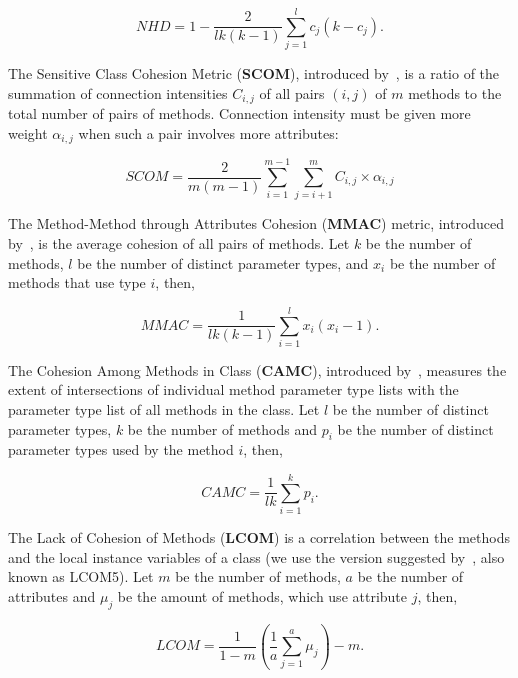 \documentclass[sigconf,10pt,nonacm=true]{acmart}
\begin{document}
\begin{equation}
\mathit{NHD} = 1 - \frac{2}{lk(k-1)} \sum_{j=1}^{l} c_j(k-c_j).
\end{equation}

The Sensitive Class Cohesion Metric (\textbf{SCOM}),
introduced by~\citet{fernandez06}, is a
ratio of the summation of connection intensities $C_{i,j}$ of
all pairs $(i,j)$ of $m$ methods to the total number of pairs of methods.
Connection intensity must be given more weight $\alpha_{i,j}$ when such a
pair involves more attributes:

\begin{equation}
\mathit{SCOM} = \frac{2}{m(m-1)} \sum_{i=1}^{m-1} \sum_{j=i+1}^{m} C_{i,j} \times \alpha_{i,j}
\end{equation}

The Method-Method through Attributes Cohesion (\textbf{MMAC}) metric,
introduced by~\citet{dallal07}, is
the average cohesion of all pairs of methods.
Let $k$ be the number of methods, $l$ be the number of distinct parameter types,
and $x_i$ be the number of methods that use type $i$, then,

\begin{equation}
\mathit{MMAC} = \frac{1}{lk(k-1)} \displaystyle\sum_{i=1}^{l} x_i (x_i - 1).
\end{equation}

The Cohesion Among Methods in Class (\textbf{CAMC}), introduced by~\citet{bansiya99},
measures the extent of intersections of individual method parameter
type lists with the parameter type list of all methods in the class.
Let $l$ be the number of distinct parameter types, $k$ be the number
of methods and $p_i$ be the number of distinct parameter
types used by the method $i$, then,

\begin{equation}
\mathit{CAMC} = \frac{1}{lk} \sum_{i=1}^{k} p_i.
\end{equation}

The Lack of Cohesion of Methods (\textbf{LCOM}) is
a correlation between the methods and the local instance variables of a class
(we use the version suggested by~\citet{henderson96}, also known as LCOM5).
Let $m$ be the number of methods, $a$ be the number of
attributes and $\mu_j$ be the amount of methods, which use attribute $j$, then,

\begin{equation}
\mathit{LCOM} = \frac{1}{1 - m} \left( \dfrac{1}{a} \displaystyle\sum_{j=1}^{a} \mu_j \right) - m.
\end{equation}
\end{document}
